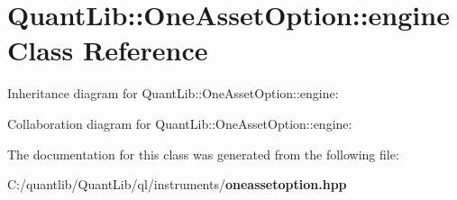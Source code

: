 \section{Quant\+Lib\+:\+:One\+Asset\+Option\+:\+:engine Class Reference}
\label{class_quant_lib_1_1_one_asset_option_1_1engine}


Inheritance diagram for Quant\+Lib\+:\+:One\+Asset\+Option\+:\+:engine\+:


Collaboration diagram for Quant\+Lib\+:\+:One\+Asset\+Option\+:\+:engine\+:


The documentation for this class was generated from the following file\+:\begin{DoxyCompactItemize}
\item 
C\+:/quantlib/\+Quant\+Lib/ql/instruments/{\bf oneassetoption.\+hpp}\end{DoxyCompactItemize}
